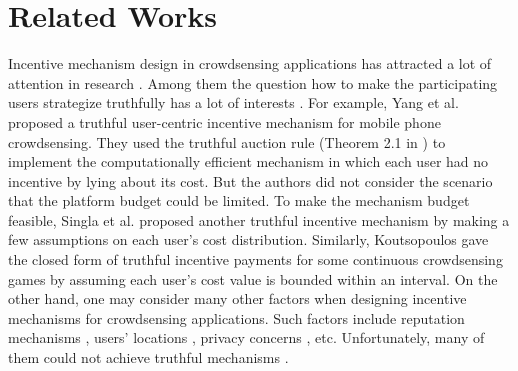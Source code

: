 \documentclass[conference]{IEEEtran}
\theoremstyle{definition}
\begin{document}
\section{Related Works}
\label{sec:rw}
Incentive mechanism design in crowdsensing applications has attracted a lot of attention in research \cite{ganti2011mobile, singer2013pricing, vukovic2010ubiquitous, yang2012crowdsourcing, zhao2012evaluation, koutsopoulos2013optimal, zhang2012reputation, singla2013truthful, jaimes2012location, singla2013incentives}. Among them the question how to make the participating users strategize truthfully has a lot of interests \cite{singer2013pricing, vukovic2010ubiquitous}. For example, Yang et al. \cite{yang2012crowdsourcing} proposed a truthful user-centric incentive mechanism for mobile phone crowdsensing. They used the truthful auction rule (Theorem 2.1 in \cite{singer2010budget}) to implement the computationally efficient mechanism in which each user had no incentive by lying about its cost. But the authors did not consider the scenario that the platform budget could be limited. To make the mechanism budget feasible, Singla et al. \cite{singla2013truthful} proposed another truthful incentive mechanism by making a few assumptions on each user's cost distribution. Similarly, Koutsopoulos \cite{koutsopoulos2013optimal} gave the closed form of truthful incentive payments for some continuous crowdsensing games by assuming each user's cost value is bounded within an interval. On the other hand, one may consider many other factors when designing incentive mechanisms for crowdsensing applications. Such factors include reputation mechanisms \cite{zhang2012reputation}, users' locations \cite{jaimes2012location}, privacy concerns \cite{singla2013incentives}, etc. Unfortunately, many of them could not achieve truthful mechanisms \cite{zhang2012reputation, jaimes2012location}.
\end{document}
